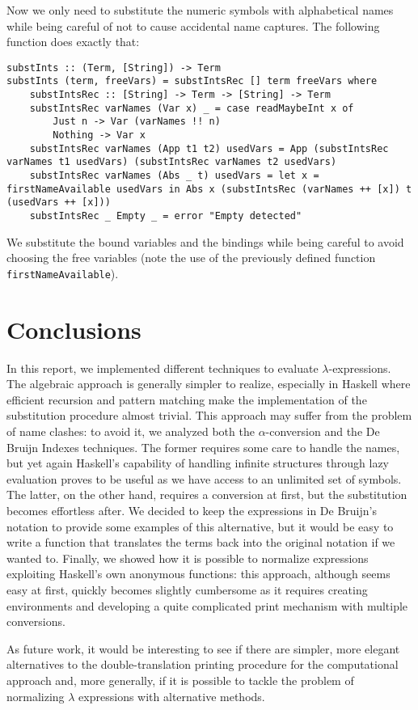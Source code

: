 \documentclass{article}
\begin{document}
Now we only need to substitute the numeric symbols with alphabetical names while being careful of not to cause accidental name captures. The following function does exactly that:

\begin{lstlisting}
substInts :: (Term, [String]) -> Term
substInts (term, freeVars) = substIntsRec [] term freeVars where
    substIntsRec :: [String] -> Term -> [String] -> Term
    substIntsRec varNames (Var x) _ = case readMaybeInt x of
        Just n -> Var (varNames !! n)
        Nothing -> Var x
    substIntsRec varNames (App t1 t2) usedVars = App (substIntsRec varNames t1 usedVars) (substIntsRec varNames t2 usedVars)
    substIntsRec varNames (Abs _ t) usedVars = let x = firstNameAvailable usedVars in Abs x (substIntsRec (varNames ++ [x]) t (usedVars ++ [x]))
    substIntsRec _ Empty _ = error "Empty detected"
\end{lstlisting}

We substitute the bound variables and the bindings while being careful to avoid choosing the free variables (note the use of the previously defined function \lstinline|firstNameAvailable|).

\section{Conclusions}\label{sec:conclusions}

In this report, we implemented different techniques to evaluate $\lambda$-expressions. The algebraic approach is generally simpler to realize, especially in Haskell where efficient recursion and pattern matching make the implementation of the substitution procedure almost trivial. This approach may suffer from the problem of name clashes: to avoid it, we analyzed both the $\alpha$-conversion and the De Bruijn Indexes techniques. The former requires some care to handle the names, but yet again Haskell's capability of handling infinite structures through lazy evaluation proves to be useful as we have access to an unlimited set of symbols. The latter, on the other hand, requires a conversion at first, but the substitution becomes effortless after. We decided to keep the expressions in De Bruijn's notation to provide some examples of this alternative, but it would be easy to write a function that translates the terms back into the original notation if we wanted to. Finally, we showed how it is possible to normalize expressions exploiting Haskell's own anonymous functions: this approach, although seems easy at first, quickly becomes slightly cumbersome as it requires creating environments and developing a quite complicated print mechanism with multiple conversions.

As future work, it would be interesting to see if there are simpler, more elegant alternatives to the double-translation printing procedure for the computational approach and, more generally, if it is possible to tackle the problem of normalizing $\lambda$ expressions with alternative methods.

\end{document}
